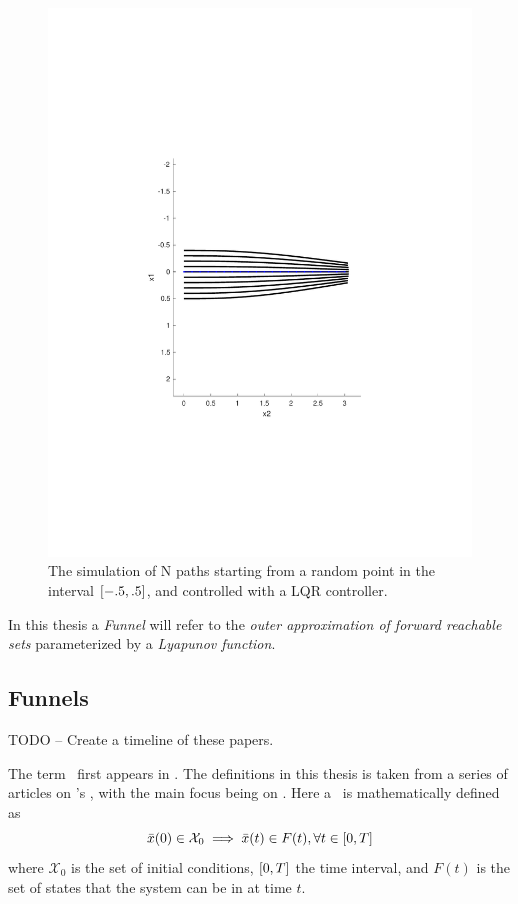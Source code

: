 \begin{figure}
  \centering \includegraphics[scale=.5]{figures/preliminaries/montecarlofunnel}
  \caption{The simulation of N paths starting from a random point in the
    interval \(\lbrack-.5,.5\rbrack\), and controlled with a LQR controller.}
  \label{fig:monte-carlo-sim}
\end{figure}

In this thesis a \textit{Funnel} will refer to the \textit{outer approximation
  of forward reachable sets} parameterized by a \textit{Lyapunov function}.


\subsection{Funnels}
\label{sec:Funnels}

TODO -- Create a timeline of these papers.

The term \funnel\ first appears in \cite{masonMechanicsManipulation1985}. The
\funnel{} definitions in this thesis is taken from a series of articles on
\funnel{}'s \cite{tobenkinInvariantFunnelsTrajectories2010}
\cite{tedrakeLQRtreesFeedbackMotion2009} \cite{majumdarRobustOnlineMotion2013}
\cite{majumdarFunnelLibrariesRealtime2017}
\cite{ahmadiDSOSSDSOSOptimization2017}, with the main focus being on
\cite{majumdarFunnelLibrariesRealtime2017}. Here a \funnel\ is mathematically
defined as
\[
  \bar{x}(0) \in \mathcal{X}_0 \implies \bar{x}(t) \in F(t), \forall t \in
  \lbrack0,T\rbrack
\]
where \(\mathcal{X}_0\) is the set of initial conditions, \(\lbrack0,T\rbrack\) the time
interval, and \(F(t)\) is the set of states that the system can be in at time
\(t\).

